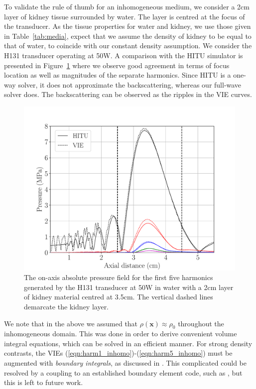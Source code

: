 \documentclass[preprint]{JASA}
\newcommand{\bx}{\mathbf{x}}
\begin{document}
{To validate the rule of thumb for an inhomogeneous medium, we consider a 2cm layer
of kidney tissue surrounded by water. The layer is centred at the focus of the transducer.
As the tissue properties for water and kidney, we use those given in Table~\ref{tab:media},
expect that we assume the density of kidney to be equal to that of water, to coincide
with our constant density assumption. We consider the H131 transducer operating 
at 50W. A comparison with the HITU simulator is presented in Figure~\ref{fig:HITU_comparison_slab}
where we observe good agreement in terms of focus location as well as magnitudes of
the separate harmonics. Since HITU is a one-way solver, it does not approximate 
the backscattering, whereas our full-wave solver does. The backscattering can 
be observed as the ripples in the VIE curves.

\begin{figure}[h!]
    \centering
    \includegraphics[width=\linewidth]{figures/H131_HITU_comparison_water_kidney_slab_power50}
    \caption{The on-axis absolute pressure field for the first five harmonics generated 
    by the H131 transducer at 50W in water with a 2cm layer of kidney material centred 
    at 3.5cm. The vertical dashed lines demarcate the kidney layer.}
    \label{fig:HITU_comparison_slab}
\end{figure}  

We note that in the above we assumed that $\rho(\bx)\approx\rho_0$ throughout 
the inhomogeneous domain. This was done in order to derive convenient volume integral 
equations, which can be solved in an efficient manner. For strong density contrasts, 
the VIEs (\ref{eqn:harm1_inhomo})-(\ref{eqn:harm5_inhomo}) must be augmented with 
\textit{boundary integrals}, as discussed in \cite{costabel2015spectrum}. This 
complicated could be resolved by a coupling to an established boundary element code, such 
as \cite{van2015fast}, but this is left to future work.
}
\end{document}
